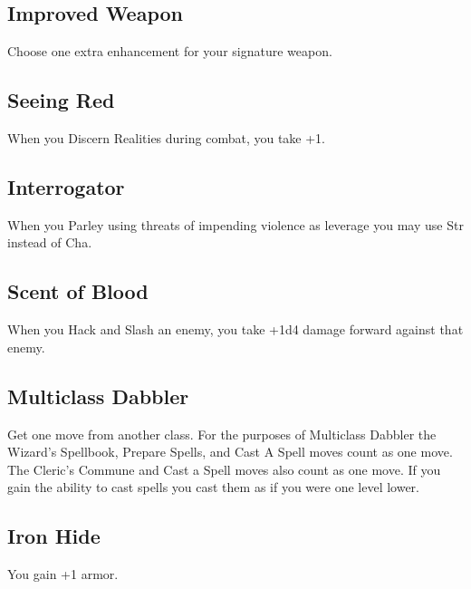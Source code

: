          
\subsection{Improved Weapon}    
         

Choose one extra enhancement for your signature weapon.

         
\subsection{Seeing Red}   
         

When you Discern Realities during combat, you take +1.

         
\subsection{Interrogator}   
         

When you Parley using threats of impending violence as leverage you may use Str instead of Cha.

         
\subsection{Scent of Blood}    
         

When you Hack and Slash an enemy, you take +1d4 damage forward against that enemy.

         
\subsection{Multiclass Dabbler}    
         

Get one move from another class. For the purposes of Multiclass Dabbler the Wizard's Spellbook, Prepare Spells, and Cast A Spell moves count as one move. The Cleric's Commune and Cast a Spell moves also count as one move. If you gain the ability to cast spells you cast them as if you were one level lower.

         
\subsection{Iron Hide}    
         

You gain +1 armor.

